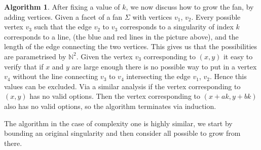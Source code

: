 \documentclass[12pt,a4paper]{book}      %
\theoremstyle{definition}
\newtheorem{algorithm}{Algorithm}
\newcommand{\mb}[1]{\mathbb{#1}}
\begin{document}
\begin{algorithm}
After fixing a value of $k$, we now discuss how to grow the fan, by adding vertices. Given a facet of a fan $\Sigma$ with vertices $v_1$, $v_2$. Every possible vertex $v_3$ such that the edge $v_2$ to $v_3$ corresponds to a singularity of index $k$ corresponds to a line, (the blue and red lines in the picture above), and the length of the edge connecting the two vertices. This gives us that the possibilities are parametrised by $\mb{N}^2$. Given the vertex $v_3$ corresponding to $(x,y)$ it easy to verify that if $x$ and $y$ are large enough there is no possible way to put in a vertex $v_4$ without the line connecting $v_3$ to $v_4$ intersecting the edge $v_1$, $v_2$. Hence this values can be excluded. Via a similar analysis if the vertex corresponding to $(x,y)$ has no valid options. Then the vertex corresponding to $(x+ak, y+bk)$ also has no valid options, so the algorithm terminates via induction.
\end{algorithm}

The algorithm in the case of complexity one is highly similar, we start by bounding an original singularity and then consider all possible to grow from there.
\end{document}
